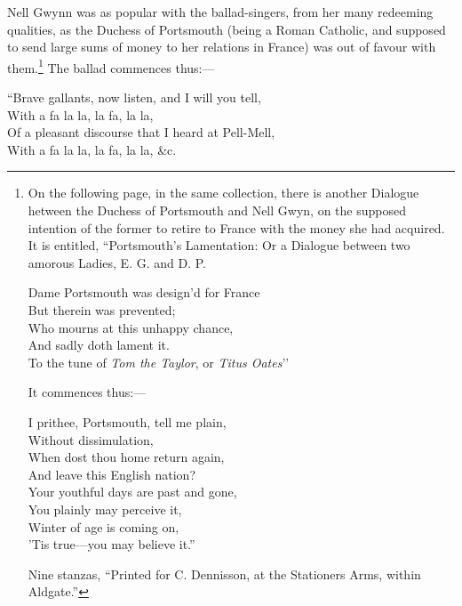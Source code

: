 Nell Gwynn was as popular with the ballad-singers, from her many redeeming
qualities, as the Duchess of Portsmouth (being a Roman Catholic, and supposed
to send large sums of money to her relations in France) was out of favour with
them.\footnote{\textit{}
On the following page, in the same collection, there
is another Dialogue hetween the Duchess of Portsmouth
and Nell Gwyn, on the supposed intention of the former
to retire to France with the money she had acquired. It
is entitled, “Portsmouth’s Lamentation: Or a Dialogue
between two amorous Ladies, E. G. and D. P.
\settowidth{\versewidth}{Dame Portsmouth was design’d for France}
\begin{fnverse}
\vin {}Dame Portsmouth was design’d for France\\
\vin But therein was prevented;\\
\vin Who mourns at this unhappy chance,\\
\vin And sadly doth lament it.\\
\vin\vin To the tune of \textit{Tom the Taylor}, or \textit{Titus Oates}’’
\end{fnverse}
It commences thus:—
\begin{fnverse}
\vin{}I prithee, Portsmouth, tell me plain,\\
\vin\vin  Without dissimulation,\\
\vin  When dost thou home return again,\\
\vin\vin  And leave this English nation?\\
\vin Your youthful days are past and gone,\\
\vin\vin  You plainly may perceive it,\\
\vin Winter of age is coming on,\\
\vin\vin ’Tis true—you may believe it.”
\end{fnverse}
Nine stanzas, “Printed for C. Dennisson, at the Stationers
Arms, within Aldgate.”}
 The ballad commences thus:—
 
 
\settowidth{\versewidth}{Of a pleasant discourse that I heard at Pell-Mell,}
\begin{scverse}\begin{altverse}
“Brave gallants, now listen, and I will you tell,\\
With a fa la la, la fa, la la,\\
Of a pleasant discourse that I heard at Pell-Mell,\\
With a fa la la, la fa, la la, \&c.
\end{altverse}
\end{scverse}

